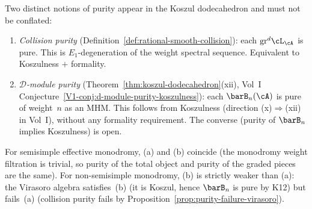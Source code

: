 \begin{remark}
\smallskip
Two distinct notions of purity appear in the Koszul dodecahedron
and must not be conflated:
\begin{enumerate}[label=\textup{(\alph*)}]
\item \emph{Collision purity}
 (Definition~\ref{def:rational-smooth-collision}): each
 $\mathrm{gr}^d\cL_\cA$ is pure. This is $E_1$-degeneration
 of the weight spectral sequence. Equivalent to Koszulness
 $+$ formality.
\item \emph{$\mathcal{D}$-module purity}
 (Theorem~\ref{thm:koszul-dodecahedron}(xii), Vol~I
 Conjecture~\ref*{V1-conj:d-module-purity-koszulness}):
 each $\barB_n(\cA)$ is pure of weight~$n$ as an MHM. This
 follows from Koszulness (direction (x)$\Rightarrow$(xii)
 in Vol~I), without any formality requirement. The converse
 (purity of $\barB_n$ implies Koszulness) is open.
\end{enumerate}
For semisimple effective monodromy, (a) and (b) coincide
(the monodromy weight filtration is trivial, so purity of the
total object and purity of the graded pieces are the same).
For non-semisimple monodromy, (b) is strictly weaker than (a):
the Virasoro algebra satisfies~(b) (it is Koszul, hence
$\barB_n$ is pure by K12) but fails~(a) (collision purity fails
by Proposition~\ref{prop:purity-failure-virasoro}).
\end{remark}

